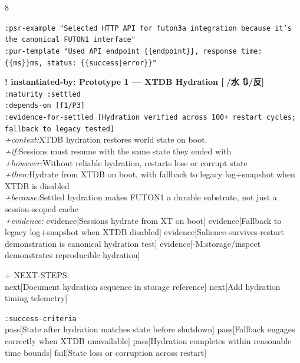 \documentclass[landscape]{article}
\newcommand{\flexitag}[1]{\textcolor[gray]{0.35}{\textit{#1}}}
\newenvironment{devmapsettled}{%
  \def\FrameCommand{\colorbox{devmapsettledbg}}%
  \setlength{\fboxsep}{2pt}%
  \MakeFramed{\advance\hsize-\width \FrameRestore}%
}{\endMakeFramed}
\begin{document}
\begin{paracol}{8}
\begin{devmapsettled}
  \texttt{:\allowbreak{}psr-\allowbreak{}example "Selected HTTP API for futon3a integration because it's the canonical FUTON1 interface"}\\
  \texttt{:\allowbreak{}pur-\allowbreak{}template "Used API endpoint \{\{endpoint\}\},\allowbreak{} response time:\allowbreak{} \{\{ms\}\}ms,\allowbreak{} status:\allowbreak{} \{\{success|\allowbreak{}error\}\}"}\\
\par
\par
\end{devmapsettled}
\begin{devmapsettled}
\textbf{! instantiated-by: Prototype 1 — XTDB Hydration [🌊/水 🔃/反]}\\
  \texttt{:\allowbreak{}maturity :\allowbreak{}settled}\\
  \texttt{:\allowbreak{}depends-\allowbreak{}on [f1/\allowbreak{}P3]}\\
  \texttt{:\allowbreak{}evidence-\allowbreak{}for-\allowbreak{}settled [Hydration verified across 100+\allowbreak{} restart cycles;\allowbreak{} fallback to legacy tested]}\\
  \flexitag{+context:}XTDB hydration restores world state on boot.\\
  \flexitag{+if:}Sessions must resume with the same state they ended with\\
  \flexitag{+however:}Without reliable hydration, restarts lose or corrupt state\\
  \flexitag{+then:}Hydrate from XTDB on boot, with fallback to legacy log+snapshot when XTDB is disabled\\
  \flexitag{+because:}Settled hydration makes FUTON1 a durable substrate, not just a session-scoped cache\\
  \flexitag{+evidence:} evidence[Sessions hydrate from XT on boot] evidence[Fallback to legacy log+snapshot when XTDB disabled] evidence[Salience-survives-restart demonstration is canonical hydration test] evidence[-M:storage/inspect demonstrates reproducible hydration]\\
\par
  + NEXT-STEPS:\\
    next[Document hydration sequence in storage reference] next[Add hydration timing telemetry]\\
\par
  \texttt{:\allowbreak{}success-\allowbreak{}criteria}\\
    pass[State after hydration matches state before shutdown] pass[Fallback engages correctly when XTDB unavailable] pass[Hydration completes within reasonable time bounds] fail[State loss or corruption across restart]\\

\end{devmapsettled}
\end{paracol}
\end{document}
